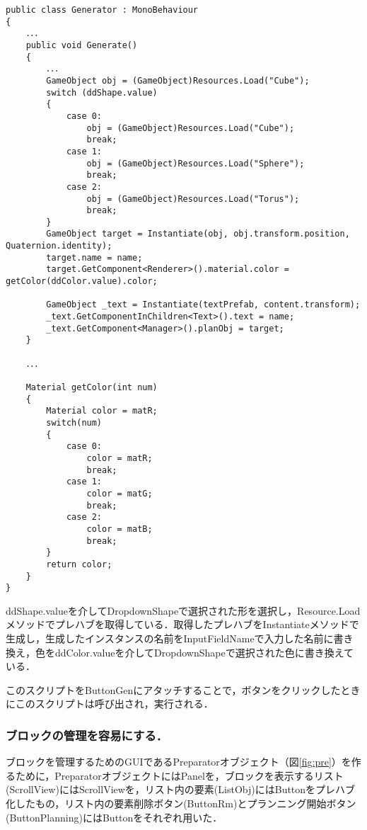 \documentclass[12pt]{jarticle}
\begin{document}
\begin{lstlisting}[caption=Generatorクラス, label=src:gen]
public class Generator : MonoBehaviour
{
    ．．．
    public void Generate()
    {
        ．．．
        GameObject obj = (GameObject)Resources.Load("Cube");
        switch (ddShape.value)
        {
            case 0:
                obj = (GameObject)Resources.Load("Cube");
                break;
            case 1:
                obj = (GameObject)Resources.Load("Sphere");
                break;
            case 2:
                obj = (GameObject)Resources.Load("Torus");
                break;
        }
        GameObject target = Instantiate(obj, obj.transform.position, Quaternion.identity);
        target.name = name;
        target.GetComponent<Renderer>().material.color = getColor(ddColor.value).color;

        GameObject _text = Instantiate(textPrefab, content.transform);
        _text.GetComponentInChildren<Text>().text = name;
        _text.GetComponent<Manager>().planObj = target;
    }
    
    ．．．

    Material getColor(int num)
    {
        Material color = matR;
        switch(num)
        {
            case 0:
                color = matR;
                break;
            case 1:
                color = matG;
                break;
            case 2:
                color = matB;
                break;
        }
        return color;
    }
}
\end{lstlisting}

ddShape.valueを介してDropdownShapeで選択された形を選択し，Resource.Loadメソッドでプレハブを取得している．取得したプレハブをInstantiateメソッドで生成し，生成したインスタンスの名前をInputFieldNameで入力した名前に書き換え，色をddColor.valueを介してDropdownShapeで選択された色に書き換えている．

このスクリプトをButtonGenにアタッチすることで，ボタンをクリックしたときにこのスクリプトは呼び出され，実行される．
\clearpage

\subsubsection{ブロックの管理を容易にする．}
ブロックを管理するためのGUIであるPreparatorオブジェクト（図\ref{fig:pre}）を作るために，PreparatorオブジェクトにはPanelを，ブロックを表示するリスト(ScrollView)にはScrollViewを，リスト内の要素(ListObj)にはButtonをプレハブ化したもの，リスト内の要素削除ボタン(ButtonRm)とプランニング開始ボタン(ButtonPlanning)にはButtonをそれぞれ用いた．
\end{document}

